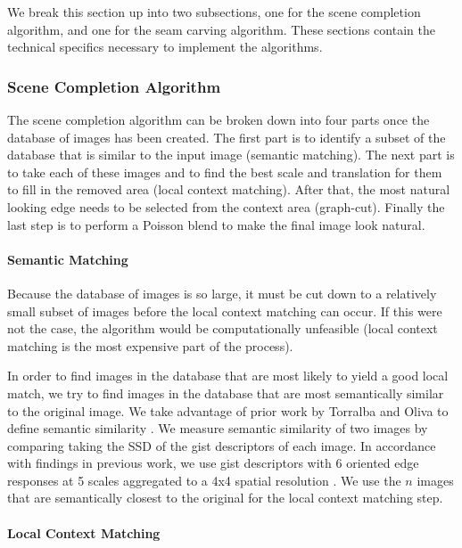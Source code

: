 \documentclass[11pt]{amsart}
\begin{document}
We break this section up into two subsections, one for the scene completion algorithm, and one
for the seam carving algorithm. These sections contain the technical specifics necessary to implement 
the algorithms.

\subsubsection{Scene Completion Algorithm}

The scene completion algorithm can be broken down into four parts once the database of images has been created. The first part is to identify a subset of the database that is similar to the input image (semantic matching). The next part is to take each of these images and to find the best scale and translation for them to fill in the removed area (local context matching). After that, the most natural looking edge needs to be selected from the context area (graph-cut). Finally the last step is to perform a Poisson blend to make the final image look natural.

\paragraph{\sc Semantic Matching} 

Because the database of images is so large, it must be cut down to a relatively small subset of images before the local context matching can occur. If this were not the case, the algorithm would be computationally unfeasible (local context matching is the most expensive part of the process). 

In order to find images in the database that are most likely to yield a good local match, we try to find images in the database that are most semantically similar to the original image. We take advantage of prior work by Torralba and Oliva to define semantic similarity \cite{Torralba:2006}. We measure semantic similarity of two images by comparing taking the SSD of the gist descriptors of each image. In accordance with findings in previous work, we use gist descriptors with 6 oriented edge responses at 5 scales aggregated to a
4x4 spatial resolution \cite{Hays:2007}. We use the $n$ images that are semantically closest to the original
for the local context matching step. 

\paragraph{\sc Local Context Matching}
\end{document}
